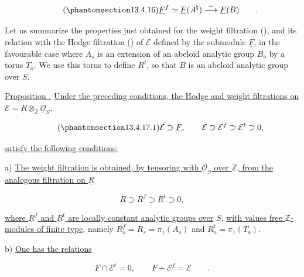 \begin{equation}\tag{\SGARefTarget{sga7.sga7i.eix.n13-4-16}{13.4.16}}
 \underline F^f\simeq\underline F(A^\natural)
 \stackrel{\sim}{\longrightarrow}\underline F(B)\qquad .
\end{equation}

\noindent
Let us summarize the properties just obtained for the weight filtration
(), and its relation with the Hodge filtration () of
$\mathcal E$ defined by the submodule $\underline F$, in the favourable
case  where $A_s$ is an extension of an abeloid analytic group
$B_o$ by a torus $T_o$.  We use this torus to define $R^t$, so that $B$
is an abeloid analytic group over $S$.

\medskip
\noindent
\underline{Proposition .} \underline{Under the preceding
conditions, the Hodge and weight filtrations on}
$\mathcal E=\underline R\otimes_{\mathbb Z}\underline{\mathcal O}_S$,

\begin{equation}\tag{\SGARefTarget{sga7.sga7i.eix.n13-4-17-1}{13.4.17.1}}
 \mathcal E\supset\underline F,
 \qquad
 \mathcal E\supset\mathcal E^f\supset\mathcal E^t\supset0,
\end{equation}

\noindent
\underline{satisfy the following conditions:}

\smallskip
\noindent
a) \underline{The weight filtration is obtained, by tensoring with
$\underline{\mathcal O}_S$ over $\mathbb Z$, from the analogous
filtration on $\underline R$}

\begin{equation*}
 \underline R\supset\underline R^f\supset\underline R^t\supset0,
\end{equation*}

\noindent
\underline{where $\underline R^f$ and $\underline R^t$ are locally
constant analytic groups over} $S$, \underline{with values free $\mathbb Z$-modules
of finite type}, namely
$R_o^f=R_s=\pi_1(A_s)$ and $R_o^t=\pi_1(T_o)$.

\smallskip
\noindent
b) \underline{One has the relations}

\begin{equation}\tag{*}
 \underline F\cap\mathcal E^t=0,
 \qquad \underline F+\mathcal E^f=\mathcal E\qquad .
\end{equation}

